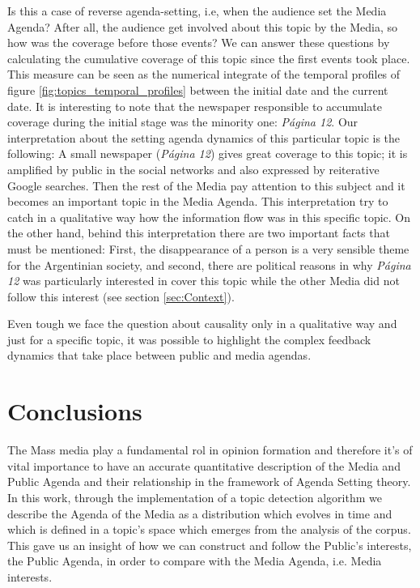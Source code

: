 \documentclass{bmcart}
\begin{document}
\par Is this a case of reverse agenda-setting, i.e, when the audience set the Media Agenda? 
After all,  the audience get involved about this topic by the Media, so how was the coverage before those events?
We can answer these questions by calculating the cumulative coverage of this topic since the first events took place.
This measure can be seen as the numerical integrate of the temporal profiles of figure \ref{fig:topics_temporal_profiles} between the initial date and the current date. 
It is interesting to note that the newspaper responsible to accumulate coverage during the initial stage was the minority one: \emph{P\'agina 12}. 
Our interpretation about the setting agenda dynamics of this particular topic is the following: A small newspaper (\emph{P\'agina 12}) gives great coverage to this topic; it is amplified  by public in the social networks and also expressed  by reiterative Google searches. Then the rest of the Media  pay attention to this subject and it becomes an important topic in the Media Agenda. 
This interpretation try to catch in a qualitative way how the information flow was in this specific topic.
On the other hand, behind this interpretation there are two important facts that must be mentioned: First, the disappearance of a person is a very sensible theme for the Argentinian society, and second, there are political reasons in why \emph{P\'agina 12} was particularly interested in cover this topic while the other Media did not follow this interest (see section \ref{sec:Context}).

\par Even tough we face the question about causality only in a qualitative way and just for a specific topic, it was possible to highlight  the complex feedback dynamics that take place between public and media agendas.

\section*{Conclusions}

\par The  Mass media play a fundamental rol in opinion formation and therefore it's of vital importance to have an accurate  quantitative description of the Media  and Public Agenda and their relationship in the framework of Agenda Setting theory.
In this work, through the implementation of a topic detection algorithm we describe the Agenda of the Media as a distribution which evolves in time and which is defined in a topic's space which emerges from the analysis of the corpus. This gave us an insight of how we can construct and follow the Public's interests, the Public Agenda, in order to compare with the Media Agenda, i.e. Media interests. 
\end{document}
